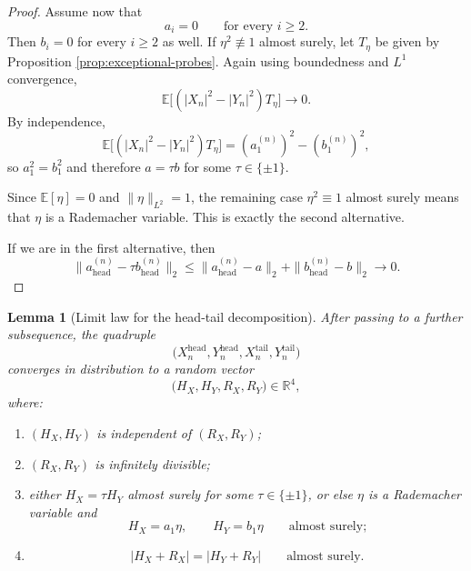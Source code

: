 \documentclass[11pt]{amsart}
\newtheorem{lemma}[theorem]{Lemma}
\newcommand{\E}{\mathbb E}
\newcommand{\R}{\mathbb R}
\begin{document}
\begin{proof}
Assume now that
\[
a_i = 0
\qquad
\text{for every } i \ge 2.
\]
Then $b_i=0$ for every $i \ge 2$ as well. If $\eta^2 \not\equiv 1$ almost
surely, let $T_\eta$ be given by Proposition
\ref{prop:exceptional-probes}. Again using boundedness and $L^1$ convergence,
\[
\E\bigl[(|X_n|^2-|Y_n|^2) T_\eta\bigr] \longrightarrow 0.
\]
By independence,
\[
\E\bigl[(|X_n|^2-|Y_n|^2) T_\eta\bigr]
=
(a_1^{(n)})^2-(b_1^{(n)})^2,
\]
so $a_1^2=b_1^2$ and therefore $a=\tau b$ for some $\tau \in \{\pm 1\}$.

Since $\E[\eta]=0$ and $\|\eta\|_{L^2}=1$, the remaining case
$\eta^2 \equiv 1$ almost surely means that $\eta$ is a Rademacher variable.
This is exactly the second alternative.

If we are in the first alternative, then
\[
\|a^{(n)}_{\mathrm{head}} - \tau b^{(n)}_{\mathrm{head}}\|_2
\le
\|a^{(n)}_{\mathrm{head}}-a\|_2
+
\|b^{(n)}_{\mathrm{head}}-b\|_2
\longrightarrow 0.
\]
\end{proof}

\begin{lemma}[Limit law for the head-tail decomposition]
\label{lem:limit-law}
After passing to a further subsequence, the quadruple
\[
\bigl(
X_n^{\mathrm{head}},
Y_n^{\mathrm{head}},
X_n^{\mathrm{tail}},
Y_n^{\mathrm{tail}}
\bigr)
\]
converges in distribution to a random vector
\[
\bigl(
H_X,H_Y,R_X,R_Y
\bigr)
\in \R^4,
\]
where:
\begin{enumerate}[label=\rm(\arabic*)]
\item $(H_X,H_Y)$ is independent of $(R_X,R_Y)$;
\item $(R_X,R_Y)$ is infinitely divisible;
\item either $H_X = \tau H_Y$ almost surely for some $\tau \in \{\pm 1\}$, or
else $\eta$ is a Rademacher variable and
\[
H_X = a_1 \eta,
\qquad
H_Y = b_1 \eta
\qquad
\text{almost surely;}
\]
\item
\[
|H_X + R_X| = |H_Y + R_Y|
\qquad
\text{almost surely.}
\]
\end{enumerate}
\end{lemma}
\end{document}
